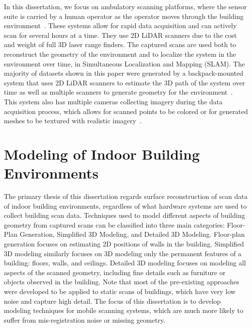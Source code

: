 \documentclass[12pt,onecolumn,oneside]{book}
\begin{document}
In this dissertation, we focus on ambulatory scanning platforms, where the sensor suite is carried by a human operator as the operator moves through the building environment~\cite{Sweep,MITBackpack,VillageHeritage}.  These systems allow for rapid data acquisition and can actively scan for several hours at a time.  They use 2D LiDAR scanners due to the cost and weight of full 3D laser range finders.  The captured scans are used both to reconstruct the geometry of the environment and to localize the system in the environment over time, in Simultaneous Localization and Mapping (SLAM).  The majority of datasets shown in this paper were generated by a backpack-mounted system that uses 2D LiDAR scanners to estimate the 3D path of the system over time as well as multiple scanners to generate geometry for the environment~\cite{liu2010indoor,Backpack,Localization,NickJournal}.  This system also has multiple cameras collecting imagery during the data acquisition process, which allows for scanned points to be colored or for generated meshes to be textured with realistic imagery~\cite{Cheng14}. 

\section{Modeling of Indoor Building Environments}
\label{sec:building_meshing}

The primary thesis of this dissertation regards surface reconstruction of scan data of indoor building environments, regardless of what hardware systems are used to collect building scan data.  Techniques used to model different aspects of building geometry from captured scans can be classified into three main categories:  Floor-Plan Generation, Simplified 3D Modeling, and Detailed 3D Modeling.  Floor-plan generation focuses on estimating 2D positions of walls in the building.  Simplified 3D modeling similarly focuses on 3D modeling only the permanent features of a building: floors, walls, and ceilings.  Detailed 3D modeling focuses on modeling all aspects of the scanned geometry, including fine details such as furniture or objects observed in the building.  Note that most of the pre-existing approaches were developed to be applied to static scans of buildings, which have very low noise and capture high detail. The focus of this dissertation is to develop modeling techniques for mobile scanning systems, which are much more likely to suffer from mis-registration noise or missing geometry.
\end{document}
